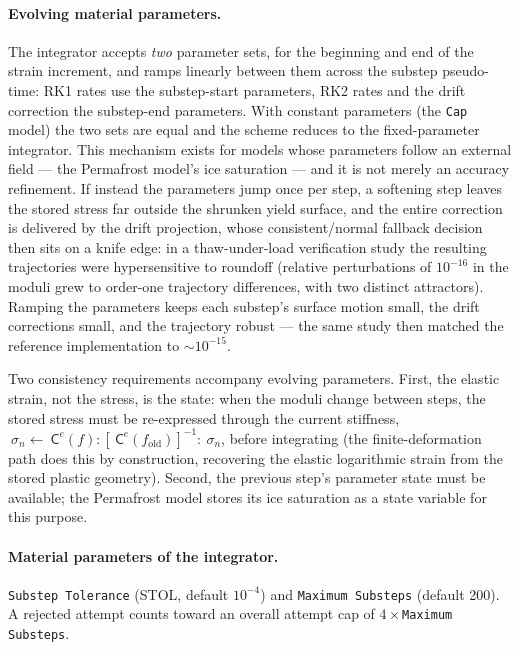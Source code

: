 \documentclass[12pt]{article}
\newcommand{\stress}{~\sigma}
\newcommand{\Celast}{{~{\mathsf C}^e}}
\begin{document}
\paragraph{Evolving material parameters.}
The integrator accepts \emph{two} parameter sets, for the beginning and
end of the strain increment, and ramps linearly between them across the
substep pseudo-time: RK1 rates use the substep-start parameters, RK2
rates and the drift correction the substep-end parameters. With
constant parameters (the \texttt{Cap} model) the two sets are equal and
the scheme reduces to the fixed-parameter integrator. This mechanism
exists for models whose parameters follow an external field --- the
Permafrost model's ice saturation --- and it is not merely an accuracy
refinement. If instead the parameters jump once per step, a softening
step leaves the stored stress far outside the shrunken yield surface,
and the entire correction is delivered by the drift projection, whose
consistent/normal fallback decision then sits on a knife edge: in a
thaw-under-load verification study the resulting trajectories were
hypersensitive to roundoff (relative perturbations of $10^{-16}$ in the
moduli grew to order-one trajectory differences, with two distinct
attractors). Ramping the parameters keeps each substep's surface motion
small, the drift corrections small, and the trajectory robust --- the
same study then matched the reference implementation to
$\sim 10^{-15}$.

Two consistency requirements accompany evolving parameters. First, the
elastic strain, not the stress, is the state: when the moduli change
between steps, the stored stress must be re-expressed through the
current stiffness, $\stress_n \leftarrow \Celast(f) :
[\Celast(f_{\mathrm{old}})]^{-1} : \stress_n$, before integrating (the
finite-deformation path does this by construction, recovering the
elastic logarithmic strain from the stored plastic geometry). Second,
the previous step's parameter state must be available; the Permafrost
model stores its ice saturation as a state variable for this purpose.

\paragraph{Material parameters of the integrator.}
\texttt{Substep Tolerance} (STOL, default $10^{-4}$) and
\texttt{Maximum Substeps} (default 200). A rejected attempt counts
toward an overall attempt cap of $4\times$\texttt{Maximum Substeps}.
\end{document}
